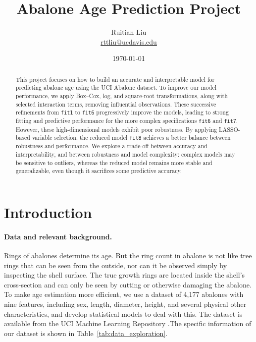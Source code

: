\documentclass[12pt]{article}
\title{Abalone Age Prediction Project}
\author{
	Ruitian Liu \\
	\href{mailto:rttliu@ucdavis.edu}{rttliu@ucdavis.edu}
}
\date{\today}
\begin{document}
	\maketitle
	\begin{abstract}
		This project focuses on how to build an accurate and interpretable model for predicting abalone age using the UCI Abalone dataset. 
		To improve our model performance, we apply Box–Cox, log, and square-root transformations, along with selected interaction terms, removing influential observations. These successive refinements from \texttt{fit1} to \texttt{fit6} progressively improve the models, leading to strong fitting and predictive performance for the more complex specifications \texttt{fit6} and \texttt{fit7}. However, these high-dimensional models exhibit poor robustness. By applying LASSO-based variable selection, the reduced model \texttt{fit8} achieves a better balance between robustness and performance. We explore a trade-off between accuracy and interpretability, and between robustness and model complexity: complex models may be sensitive to outliers, whereas the reduced model remains more stable and generalizable, even though it sacrifices some predictive accuracy.
	\end{abstract}
	
	\section*{Introduction}
	
	\paragraph{Data and relevant background.} Rings of abalones determine its age. But the ring count in abalone is not like tree rings that can be seen from the outside, nor can it be observed simply by inspecting the shell surface. The true growth rings are located inside the shell’s cross-section and can only be seen by cutting or otherwise damaging the abalone. To make age estimation more efficient, we use a dataset of 4,177 abalones with nine features, including sex, length, diameter, height, and several physical other characteristics, and develop statistical models to deal with this. The dataset is available from the UCI Machine Learning Repository \citep{uci_abalone}.The specific information of our dataset is shown in Table~\ref{tab:data_exploration}.
	
	
\end{document}
